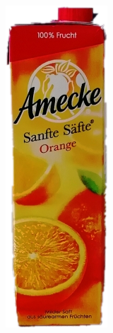 \begin{appendices}
\begin{figure}[htb]
\begin{minipage}[c]{0.2\textwidth}
\end{minipage}
\hfill
\begin{minipage}[c]{0.08\textwidth}
\includegraphics[width=\textwidth]{Sources/Bild1_HS.png}

\end{minipage}
\end{figure}
\end{appendices}
